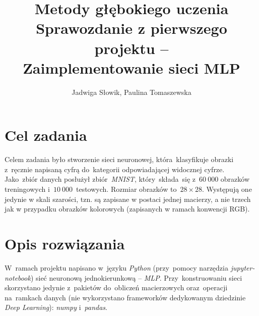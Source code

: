 \documentclass[11pt, a4paper]{article}
\title{Metody głębokiego uczenia \\
Sprawozdanie z pierwszego projektu -- \\
Zaimplementowanie sieci MLP}
\author{Jadwiga Słowik, Paulina Tomaszewska}
\begin{document}
\maketitle
\section{Cel zadania}
Celem zadania było stworzenie sieci neuronowej, która~klasyfikuje obrazki z~ręcznie napisaną cyfrą do~kategorii odpowiadającej widocznej cyfrze.
Jako~zbiór danych posłużył zbiór~\textit{MNIST}, który~składa~się z~$60\:000$ obrazków treningowych i~$10\:000$~testowych. Rozmiar obrazków to~$28 \times 28$. Występują one jedynie w skali szarości, tzn. są zapisane w postaci jednej macierzy, a nie trzech jak w przypadku obrazków kolorowych (zapisanych w ramach konwencji RGB).

\section{Opis rozwiązania}
W~ramach projektu napisano w~języku \textit{Python} (przy~pomocy narzędzia \textit{jupyter-notebook}) sieć neuronową jednokierunkową -- \textit{MLP}.
Przy~konstruowaniu sieci skorzystano jedynie z~pakietów do~obliczeń macierzowych oraz~operacji na~ramkach danych (nie wykorzystano frameworków dedykowanym dziedzinie \textit{Deep Learning}): \textit{numpy} i~\textit{pandas}.
\end{document}
